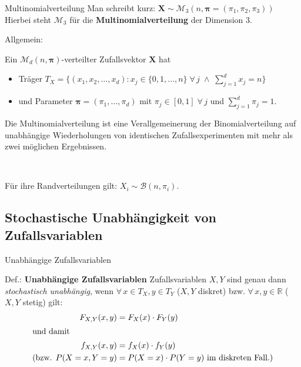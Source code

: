 \documentclass[
  10pt,
  ignorenonframetext,
]{beamer}
\providecommand{\tightlist}{%
  \setlength{\itemsep}{0pt}\setlength{\parskip}{0pt}}
\begin{document}
\begin{frame}{Multinomialverteilung}
\label{multinomialverteilung}
Man schreibt kurz:
\(\symbf{X} \sim {\mathcal M}_3(n ,\symbf{\pi}=(\pi_1,\pi_2,\pi_3))\)\\
Hierbei steht \({\mathcal M}_3\) für die \textbf{Multinomialverteilung}
der Dimension 3.

Allgemein:

Ein \({\mathcal M}_d(n, \symbf\pi)\)-verteilter Zufallsvektor
\(\symbf{X}\) hat

\begin{itemize}
\tightlist
\item
  Träger
  \(T_X = \{(x_1, x_2, \dots, x_d): x_j \in \{0, 1, \dots, n\} \;\forall\, j  \;\land\; \sum^d_{j=1} x_j = n\}\)
\item
  und Parameter \(\symbf\pi = (\pi_1, \dots, \pi_d)\) mit
  \(\pi_j \in [0, 1] \;\forall\, j\) und \(\sum^d_{j=1} \pi_j = 1\).
\end{itemize}

Die Multinomialverteilung ist eine Verallgemeinerung der
Binomialverteilung auf unabhängige Wiederholungen von identischen
Zufallsexperimenten mit mehr als zwei möglichen Ergebnissen.\\
\strut ~

Für ihre Randverteilungen gilt: \(X_i \sim {\mathcal B}(n, \pi_i)\).
\end{frame}

\subsection{Stochastische Unabhängigkeit von
Zufallsvariablen}\label{stochastische-unabhuxe4ngigkeit-von-zufallsvariablen}

\begin{frame}{Unabhängige Zufallsvariablen}
\label{unabhuxe4ngige-zufallsvariablen}
\begin{block}{Def.: \textbf{Unabhängige Zufallsvariablen}}
\label{def.-unabhuxe4ngige-zufallsvariablen}
Zufallsvariablen \(X,Y\) sind genau dann \emph{stochastisch unabhängig},
wenn \(\forall\, x \in T_X, y \in T_Y\) (\(X, Y\) diskret) bzw.
\(\forall\, x,y \in \mathbb{R}\) (\(X, Y\) stetig) gilt: \begin{align*}
F_{X,Y}(x,y) & = F_X(x) \cdot F_Y(y)\\
\intertext{und damit }  f_{X,Y}(x,y) & =  f_X(x) \cdot f_Y(y) \\
\text{(bzw. }  P(X = x, Y = y) &= P(X = x) \cdot P(Y = y) \text{ im diskreten Fall.)}
\end{align*}
\end{block}
\end{frame}
\end{document}
